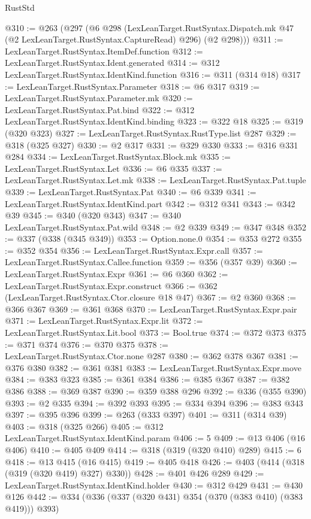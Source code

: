 \begin{lexlean}{RustStd}
\begin{coremodule}
@310 := @263
    (@297
      (@6
        @298
        (LexLeanTarget.RustSyntax.Dispatch.mk @47 (@2 LexLeanTarget.RustSyntax.CaptureRead) @296)
        (@2 @298)))
@311 := LexLeanTarget.RustSyntax.ItemDef.function
@312 := LexLeanTarget.RustSyntax.Ident.generated
@314 := @312 LexLeanTarget.RustSyntax.IdentKind.function
@316 := @311 (@314 @18)
@317 := LexLeanTarget.RustSyntax.Parameter
@318 := @6 @317
@319 := LexLeanTarget.RustSyntax.Parameter.mk
@320 := LexLeanTarget.RustSyntax.Pat.bind
@322 := @312 LexLeanTarget.RustSyntax.IdentKind.binding
@323 := @322 @18
@325 := @319 (@320 @323)
@327 := LexLeanTarget.RustSyntax.RustType.list @287
@329 := @318 (@325 @327)
@330 := @2 @317
@331 := @329 @330
@333 := @316 @331 @284
@334 := LexLeanTarget.RustSyntax.Block.mk
@335 := LexLeanTarget.RustSyntax.Let
@336 := @6 @335
@337 := LexLeanTarget.RustSyntax.Let.mk
@338 := LexLeanTarget.RustSyntax.Pat.tuple
@339 := LexLeanTarget.RustSyntax.Pat
@340 := @6 @339
@341 := LexLeanTarget.RustSyntax.IdentKind.part
@342 := @312 @341
@343 := @342 @39
@345 := @340 (@320 @343)
@347 := @340 LexLeanTarget.RustSyntax.Pat.wild
@348 := @2 @339
@349 := @347 @348
@352 := @337 (@338 (@345 @349))
@353 := Option.none.{0}
@354 := @353 @272
@355 := @352 @354
@356 := LexLeanTarget.RustSyntax.Expr.call
@357 := LexLeanTarget.RustSyntax.Callee.function
@359 := @356 (@357 @39)
@360 := LexLeanTarget.RustSyntax.Expr
@361 := @6 @360
@362 := LexLeanTarget.RustSyntax.Expr.construct
@366 := @362 (LexLeanTarget.RustSyntax.Ctor.closure @18 @47)
@367 := @2 @360
@368 := @366 @367
@369 := @361 @368
@370 := LexLeanTarget.RustSyntax.Expr.pair
@371 := LexLeanTarget.RustSyntax.Expr.lit
@372 := LexLeanTarget.RustSyntax.Lit.bool
@373 := Bool.true
@374 := @372 @373
@375 := @371 @374
@376 := @370 @375
@378 := LexLeanTarget.RustSyntax.Ctor.none @287
@380 := @362 @378 @367
@381 := @376 @380
@382 := @361 @381
@383 := LexLeanTarget.RustSyntax.Expr.move
@384 := @383 @323
@385 := @361 @384
@386 := @385 @367
@387 := @382 @386
@388 := @369 @387
@390 := @359 @388 @296
@392 := @336 (@355 @390)
@393 := @2 @335
@394 := @392 @393
@395 := @334 @394
@396 := @383 @343
@397 := @395 @396
@399 := @263 (@333 @397)
@401 := @311 (@314 @39)
@403 := @318 (@325 @266)
@405 := @312 LexLeanTarget.RustSyntax.IdentKind.param
@406 := 5
@409 := @13 @406 (@16 @406)
@410 := @405 @409
@414 := @318 (@319 (@320 @410) @289)
@415 := 6
@418 := @13 @415 (@16 @415)
@419 := @405 @418
@426 := @403 (@414 (@318 (@319 (@320 @419) @327) @330))
@428 := @401 @426 @289
@429 := LexLeanTarget.RustSyntax.IdentKind.holder
@430 := @312 @429
@431 := @430 @126
@442 := @334 (@336 (@337 (@320 @431) @354 (@370 (@383 @410) (@383 @419))) @393)

\end{coremodule}
\end{lexlean}
